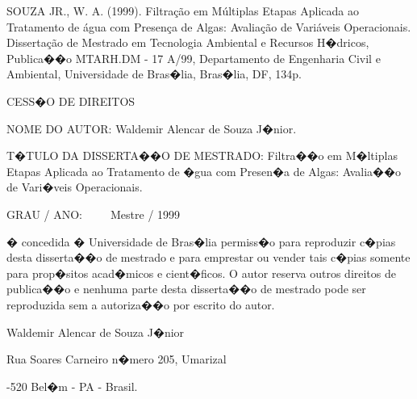 \vspace{-1mm}


\noindent    SOUZA JR., W. A. (1999). Filtração em Múltiplas Etapas Aplicada
ao Tratamento de água com Presença de Algas: Avaliação de Variáveis
Operacionais. Dissertação de Mestrado em Tecnologia Ambiental e Recursos
H�dricos, Publica��o MTARH.DM - 17 A/99, Departamento de Engenharia Civil e Ambiental, Universidade de Bras�lia, 
Bras�lia, DF, 134p.



\vspace{6mm}

\noindent \begin{bf} \MakeUppercase{Cess�o de Direitos} \end{bf}

\vspace{5mm}

\noindent NOME DO AUTOR: Waldemir Alencar de Souza J�nior.
\vspace{6mm}

\noindent T�TULO DA DISSERTA��O DE MESTRADO: Filtra��o em M�ltiplas Etapas Aplicada ao Tratamento de �gua com Presen�a 
de Algas: Avalia��o de Vari�veis Operacionais. 

\vspace{3mm}
\noindent GRAU / ANO:~ ~ ~ Mestre / 1999

\vspace{5mm}

\noindent � concedida � Universidade de Bras�lia permiss�o para reproduzir c�pias desta disserta��o de mestrado e para emprestar ou vender tais c�pias somente para prop�sitos acad�micos e cient�ficos. O autor reserva outros direitos de publica��o e nenhuma parte desta disserta��o de mestrado pode ser reproduzida sem a autoriza��o por escrito do autor.

\vspace{5mm}

\noindent \underline{\hspace{65mm}}

\vspace{-2mm}

\noindent  Waldemir Alencar de Souza J�nior
   \vspace{-2mm}

\noindent Rua Soares Carneiro n�mero 205, Umarizal 
    \vspace{-2mm}
    
-520 Bel�m - PA - Brasil.

\pagebreak


